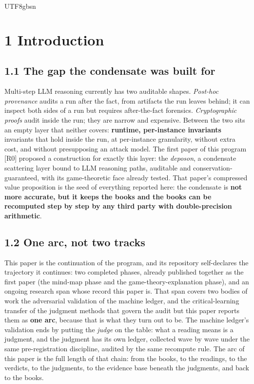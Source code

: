 \documentclass[11pt,letterpaper]{article}
\begin{document}
\begin{CJK}{UTF8}{gbsn}
\begin{abstract}
\noindent \textbf{Keywords:} auditability; conservation identity; physics-inspired formalism; pre-registered kill-lines; negative results; chain-of-thought; critical learning; distillation
\end{abstract}

\section*{1 Introduction}

\subsection*{1.1 The gap the condensate was built for}

Multi-step LLM reasoning currently has two auditable shapes. \emph{Post-hoc provenance} audits a run after the fact, from artifacts the run leaves behind; it can inspect both sides of a run but requires after-the-fact forensics. \emph{Cryptographic proofs} audit inside the run; they are narrow and expensive. Between the two sits an empty layer that neither covers: \textbf{runtime, per-instance invariants} \textemdash{} invariants that hold inside the run, at per-instance granularity, without extra cost, and without presupposing an attack model. The first paper of this program [R0] proposed a construction for exactly this layer: the \emph{deposon}, a condensate scattering layer bound to LLM reasoning paths, auditable and conservation-guaranteed, with its game-theoretic face already tested. That paper's compressed value proposition is the seed of everything reported here: the condensate is \textbf{not more accurate, but it keeps the books \textemdash{} and the books can be recomputed step by step by any third party with double-precision arithmetic}.

\subsection*{1.2 One arc, not two tracks}

This paper is the continuation of the program, and its repository self-declares the trajectory it continues: two completed phases, already published together as the first paper (the mind-map phase and the game-theory-explanation phase), and an ongoing research span whose record this paper is. That span covers two bodies of work \textemdash{} the adversarial validation of the machine ledger, and the critical-learning transfer of the judgment methods that govern the audit \textemdash{} but this paper reports them as \textbf{one arc}, because that is what they turn out to be. The machine ledger's validation ends by putting the \emph{judge} on the table: what a reading means is a judgment, and the judgment has its own ledger, collected wave by wave under the same pre-registration discipline, audited by the same recompute rule. The arc of this paper is the full length of that chain: from the books, to the readings, to the verdicts, to the judgments, to the evidence base beneath the judgments, and back to the books.


\end{CJK}
\end{document}
